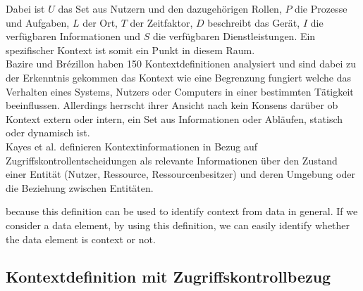Dabei ist $U$ das Set aus Nutzern und den dazugehörigen Rollen, $P$ die Prozesse und Aufgaben, $L$ der Ort, $T$ der Zeitfaktor, $D$ beschreibt das Gerät, $I$ die verfügbaren Informationen und $S$ die verfügbaren Dienstleistungen.
Ein spezifischer Kontext ist somit ein Punkt in diesem Raum.\\
Bazire und Brézillon \cite{hutchison_understanding_2005} haben 150 Kontextdefinitionen analysiert und sind dabei zu der Erkenntnis gekommen das Kontext wie eine Begrenzung fungiert welche das Verhalten eines Systems, Nutzers oder Computers in einer bestimmten Tätigkeit beeinflussen.
Allerdings herrscht ihrer Ansicht nach kein Konsens darüber ob Kontext extern oder intern, ein Set aus Informationen oder Abläufen, statisch oder dynamisch ist.\\

Kayes et al.\cite{kayes_icaf_2012} definieren Kontextinformationen in Bezug auf Zugriffskontrollentscheidungen als relevante Informationen über den Zustand einer Entität (Nutzer, Ressource, Ressourcenbesitzer) und deren Umgebung oder die Beziehung zwischen Entitäten.

because this definition can be used to identify context from data in general. If we consider a data element, by using this definition, we can easily identify whether the data element is context or not.

\subsection{Kontextdefinition mit Zugriffskontrollbezug}
